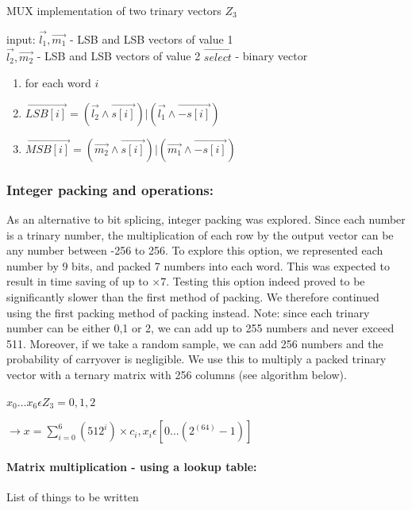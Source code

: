 \begin{algorithm}
		\caption{MUX implementation of two trinary vectors $Z_3$}
			\label{alg:algpack4} 

	
		input:   $\vec{l_1}, \vec{m_1}$ - LSB and LSB vectors of value 1  \\
					$\vec{l_2}, \vec{m_2}$ - LSB and LSB vectors of value 2
					$\vec{select}$ - binary vector

	\begin{enumerate}
		\item for each word $i$
	    \item $\vec{LSB[i]} =( \vec{l_2} \land \vec{s[i]}) | (\vec{l_1} \land \vec{- s[i]})$
	    		    \item $\vec{MSB[i]} =( \vec{m_2} \land \vec{s[i]}) | (\vec{m_1} \land \vec{- s[i]})$
		
	\end{enumerate}
	
\end{algorithm}

\fi%

\subsubsection{Integer packing and operations:} As an alternative to bit splicing, integer packing was explored. Since each number is a trinary number, the multiplication of each row by the output vector can be any number between -256 to 256. To explore this option, we represented each number by 9 bits, and packed 7 numbers into each word. This was expected to result in time saving of up to $\times 7$. Testing this option indeed proved to be significantly slower than the first method of packing. We therefore continued using the first packing method of packing instead.
Note: since each trinary number can be either 0,1 or 2, we can add up to 255 numbers and never exceed 511. Moreover, if we take a random sample, we can add 256 numbers and the probability of carryover is negligible. We use this to multiply a packed trinary vector with a ternary matrix with 256 columns (see algorithm below).
	
	$x_0 \dots x_6 \epsilon Z_3 = {0,1,2}$
	
	$ \rightarrow x = \sum_{i=0}^{6} (512^i) \times c_i, x_i \epsilon [0 ... (2^(64)-1)]$



\paragraph{Matrix multiplication - using a lookup table: }
List of things to be written\\

